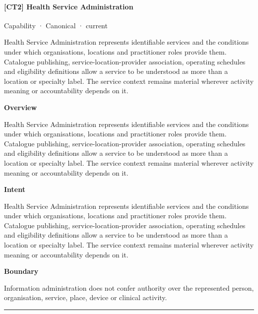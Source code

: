 \paragraph{[CT2] Health Service Administration}

\label{element:ba68a52913a0499d8377553bddfa74a4}
{\small Capability · Canonical · current}\par

Health Service Administration represents identifiable services and the conditions under which organisations, locations and practitioner roles provide them. Catalogue publishing, service-location-provider association, operating schedules and eligibility definitions allow a service to be understood as more than a location or specialty label. The service context remains material wherever activity meaning or accountability depends on it.



\textbf{Overview}



Health Service Administration represents identifiable services and the conditions under which organisations, locations and practitioner roles provide them. Catalogue publishing, service-location-provider association, operating schedules and eligibility definitions allow a service to be understood as more than a location or specialty label. The service context remains material wherever activity meaning or accountability depends on it.



\textbf{Intent}



Health Service Administration represents identifiable services and the conditions under which organisations, locations and practitioner roles provide them. Catalogue publishing, service-location-provider association, operating schedules and eligibility definitions allow a service to be understood as more than a location or specialty label. The service context remains material wherever activity meaning or accountability depends on it.



\textbf{Boundary}



Information administration does not confer authority over the represented person, organisation, service, place, device or clinical activity.



\medskip\hrule\medskip

